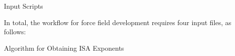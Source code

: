 \begin{subappendices}
\begin{section}{Input Scripts}

In total, the workflow for force field development requires four input files,
as follows:

\scriptsize

\normalsize

\scriptsize

\normalsize

\scriptsize

\normalsize

\scriptsize

\normalsize

\end{section}
\begin{section}{Algorithm for Obtaining ISA Exponents}
\label{sec:workflow-exponent_algorithm}

\end{section}
\end{subappendices}
